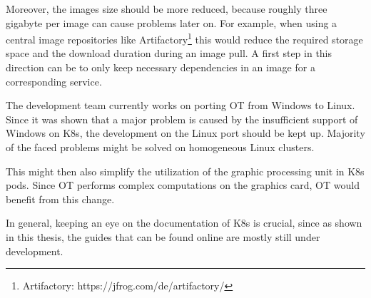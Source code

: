 Moreover, the images size should be more reduced, because roughly three gigabyte per image can cause problems later on. For example, when using a central image repositories like Artifactory\footnote{Artifactory: https://jfrog.com/de/artifactory/} this would reduce the required storage space and the download duration during an image pull. A first step in this direction can be to only keep necessary dependencies in an image for a corresponding service.

The development team currently works on porting \ac{OT} from \ac{Windows} to Linux.
Since it was shown that a major problem is caused by the insufficient support of \ac{Windows} on \ac{K8s}, the development on the Linux port should be kept up. Majority of the faced problems might be solved on homogeneous Linux clusters.

This might then also simplify the utilization of the graphic processing unit in \ac{K8s} pods. Since \ac{OT} performs complex computations on the graphics card, \ac{OT} would benefit from this change.

In general, keeping an eye on the documentation of \ac{K8s} is crucial, since as shown in this thesis, the guides that can be found online are mostly still under development.






